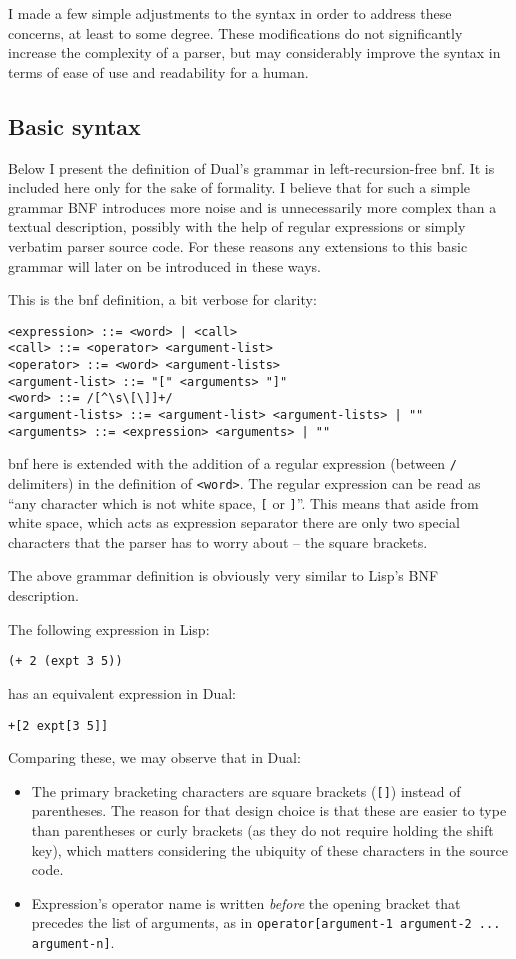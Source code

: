 I made a few simple adjustments to the syntax in order to address these concerns, at least to some degree. These modifications do not significantly increase the complexity of a parser, but may considerably improve the syntax in terms of ease of use and readability for a human.

\subsection{Basic syntax}\label{sub:basic_syntax}
Below I present the definition of Dual's grammar in left-recursion-free \acrlong{bnf}. It is included here only for the sake of formality. I believe that for such a simple grammar BNF introduces more noise and is unnecessarily more complex than a textual description, possibly with the help of regular expressions or simply verbatim parser source code. For these reasons any extensions to this basic grammar will later on be introduced in these ways.

This is the \acrshort{bnf} definition, a bit verbose for clarity:
\begin{lstlisting}
<expression> ::= <word> | <call>
<call> ::= <operator> <argument-list>
<operator> ::= <word> <argument-lists>
<argument-list> ::= "[" <arguments> "]"
<word> ::= /[^\s\[\]]+/
<argument-lists> ::= <argument-list> <argument-lists> | ""
<arguments> ::= <expression> <arguments> | ""
\end{lstlisting}

\acrshort{bnf} here is extended with the addition of a regular expression (between \texttt{/} delimiters) in the definition of \texttt{<word>}. The regular expression can be read as ``any character which is not white space,
\texttt{[} or \texttt{]}''. This means that aside from white space, which acts as
expression separator there are only two special characters that the parser has to worry about -- the square brackets.

The above grammar definition is obviously very similar to Lisp's BNF description\cite{lisp_bnf_1, lisp_bnf_2}.

The following expression in Lisp:
\begin{lstlisting}
(+ 2 (expt 3 5))
\end{lstlisting}

has an equivalent expression in Dual:
\begin{lstlisting}
+[2 expt[3 5]]
\end{lstlisting}

Comparing these, we may observe that in Dual:
\begin{itemize}
    \item The primary bracketing characters are square brackets (\texttt{[]})
    instead of parentheses. The reason for that design choice is that these
    are easier to type than parentheses or curly brackets (as they do not
    require holding the shift key), which matters considering the ubiquity of
    these characters in the source code.
    \item Expression's operator name is written \textit{before} the opening bracket that precedes the list of arguments, as in \texttt{operator[argument-1 argument-2 ... argument-n]}.
\end{itemize}

